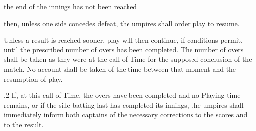 \documentclass[12pt]{article}
\begin{document}
\vspace{\baselineskip}
\begin{adjustwidth}{0.5in}{0.0in}
{\fontsize{9pt}{10.8pt}\selectfont the end of the innings has not been reached\par}\par

\end{adjustwidth}


\vspace{\baselineskip}
\begin{adjustwidth}{0.5in}{0.0in}
{\fontsize{9pt}{10.8pt}\selectfont then, unless one side concedes defeat, the umpires shall order play to resume.\par}\par

\end{adjustwidth}


\vspace{\baselineskip}

\vspace{\baselineskip}

\vspace{\baselineskip}

\vspace{\baselineskip}

\vspace{\baselineskip}
\begin{Center}
{\fontsize{8pt}{9.6pt}\par}
\end{Center}\par


\vspace{\baselineskip}

\vspace{\baselineskip}
\begin{adjustwidth}{0.5in}{0.01in}
{\fontsize{9pt}{10.8pt}\selectfont Unless a result is reached sooner, play will then continue, if conditions permit, until the prescribed number of overs has been completed. The number of overs shall be taken as they were at the call of Time for the supposed conclusion of the match. No account shall be taken of the time between that moment and the resumption of play.\par}\par

\end{adjustwidth}


\vspace{\baselineskip}
\begin{adjustwidth}{0.5in}{0.04in}
{\fontsize{9pt}{10.8pt}.2 \tabto{0.49in} If, at this call of Time, the overs have been completed and no Playing time remains, or if the side batting last has completed its innings, the umpires shall immediately inform both captains of the necessary corrections to the scores and to the result.\par}\par

\end{adjustwidth}
\end{document}

